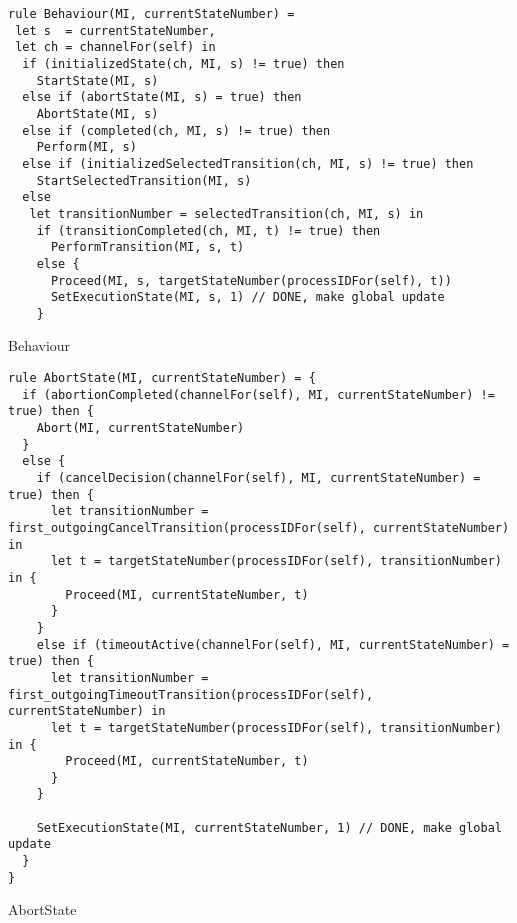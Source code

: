 \begin{listing}[H]
\begin{verbatim}
rule Behaviour(MI, currentStateNumber) =
 let s  = currentStateNumber,
 let ch = channelFor(self) in
  if (initializedState(ch, MI, s) != true) then
    StartState(MI, s)
  else if (abortState(MI, s) = true) then
    AbortState(MI, s)
  else if (completed(ch, MI, s) != true) then
    Perform(MI, s)
  else if (initializedSelectedTransition(ch, MI, s) != true) then
    StartSelectedTransition(MI, s)
  else
   let transitionNumber = selectedTransition(ch, MI, s) in
    if (transitionCompleted(ch, MI, t) != true) then
      PerformTransition(MI, s, t)
    else {
      Proceed(MI, s, targetStateNumber(processIDFor(self), t))
      SetExecutionState(MI, s, 1) // DONE, make global update
    }
\end{verbatim}
\caption{Behaviour}
\label{lst:asm:Behaviour}
\end{listing}




\begin{listing}[H]
\begin{verbatim}
rule AbortState(MI, currentStateNumber) = {
  if (abortionCompleted(channelFor(self), MI, currentStateNumber) != true) then {
    Abort(MI, currentStateNumber)
  }
  else {
    if (cancelDecision(channelFor(self), MI, currentStateNumber) = true) then {
      let transitionNumber = first_outgoingCancelTransition(processIDFor(self), currentStateNumber) in
      let t = targetStateNumber(processIDFor(self), transitionNumber) in {
        Proceed(MI, currentStateNumber, t)
      }
    }
    else if (timeoutActive(channelFor(self), MI, currentStateNumber) = true) then {
      let transitionNumber = first_outgoingTimeoutTransition(processIDFor(self), currentStateNumber) in
      let t = targetStateNumber(processIDFor(self), transitionNumber) in {
        Proceed(MI, currentStateNumber, t)
      }
    }

    SetExecutionState(MI, currentStateNumber, 1) // DONE, make global update
  }
}
\end{verbatim}
\caption{AbortState}
\label{lst:asm:AbortState}
\end{listing}




